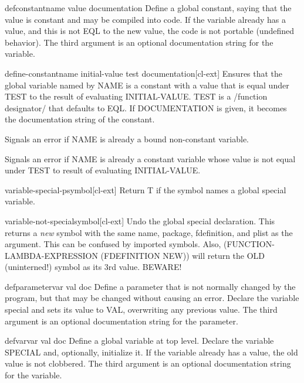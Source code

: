 \documentclass[10pt,english]{book}
\begin{document}
\begin{macro}{defconstant}{name value \op documentation}
  Define a global constant, saying that the value is constant and may be
  compiled into code. If the variable already has a value, and this is not
  EQL to the new value, the code is not portable (undefined behavior). The
  third argument is an optional documentation string for the variable.
\end{macro}

\begin{macro}{define-constant}{name initial-value \key test documentation}[cl-ext]
  Ensures that the global variable named by NAME is a constant with a value
that is equal under TEST to the result of evaluating INITIAL-VALUE. TEST is a
/function designator/ that defaults to EQL. If DOCUMENTATION is given, it
becomes the documentation string of the constant.

Signals an error if NAME is already a bound non-constant variable.

Signals an error if NAME is already a constant variable whose value is not
equal under TEST to result of evaluating INITIAL-VALUE.
\end{macro}

\begin{function}{variable-special-p}{symbol}[cl-ext]
  Return T if the symbol names a global special variable.
\end{function}

\begin{function}{variable-not-special}{symbol}[cl-ext]
  Undo the global special declaration. This returns a \emph{new}
  symbol with the same name, package, fdefinition, and plist as the
  argument. This can be confused by imported symbols. Also,
  (FUNCTION-LAMBDA-EXPRESSION (FDEFINITION NEW)) will return the OLD
  (uninterned!) symbol as its 3rd value. BEWARE!
\end{function}

\begin{macro}{defparameter}{var val \op doc}
  Define a parameter that is not normally changed by the program,
  but that may be changed without causing an error. Declare the
  variable special and sets its value to VAL, overwriting any
  previous value. The third argument is an optional documentation
  string for the parameter.
\end{macro}

\begin{macro}{defvar}{var \op val doc}
  Define a global variable at top level. Declare the variable
  SPECIAL and, optionally, initialize it. If the variable already has a
  value, the old value is not clobbered. The third argument is an optional
  documentation string for the variable.
\end{macro}
\end{document}
